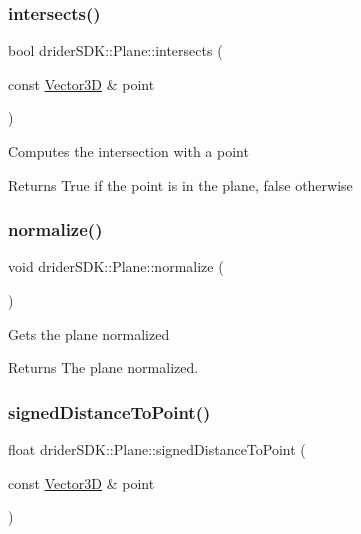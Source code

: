 \subsubsection{\texorpdfstring{intersects()}{intersects()}}
{\footnotesize\ttfamily bool drider\+S\+D\+K\+::\+Plane\+::intersects (\begin{DoxyParamCaption}\item[{const \hyperlink{classdrider_s_d_k_1_1_vector3_d}{Vector3D} \&}]{point }\end{DoxyParamCaption})}

Computes the intersection with a point

\begin{DoxyReturn}{Returns}
True if the point is in the plane, false otherwise 
\end{DoxyReturn}
\mbox{\label{classdrider_s_d_k_1_1_plane_ac8540b5c993e35b41baac2147fcbbc00}} 
\subsubsection{\texorpdfstring{normalize()}{normalize()}}
{\footnotesize\ttfamily void drider\+S\+D\+K\+::\+Plane\+::normalize (\begin{DoxyParamCaption}{ }\end{DoxyParamCaption})}

Gets the plane normalized

\begin{DoxyReturn}{Returns}
The plane normalized. 
\end{DoxyReturn}
\mbox{\label{classdrider_s_d_k_1_1_plane_a289ac3afd02981e3a1921846d9b14589}} 
\subsubsection{\texorpdfstring{signed\+Distance\+To\+Point()}{signedDistanceToPoint()}}
{\footnotesize\ttfamily float drider\+S\+D\+K\+::\+Plane\+::signed\+Distance\+To\+Point (\begin{DoxyParamCaption}\item[{const \hyperlink{classdrider_s_d_k_1_1_vector3_d}{Vector3D} \&}]{point }\end{DoxyParamCaption})}

